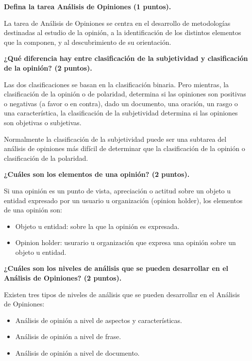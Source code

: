 \documentclass[11pt]{exam}
\begin{document}
\begin{questions}
{\bf \question Defina la tarea Análisis de Opiniones (1 puntos).}

La tarea de Análisis de Opiniones se centra en el desarrollo de metodologías destinadas al estudio de la opinión, a la identificación de los distintos elementos que la componen, y al descubrimiento de su orientación.

\newpage

{\bf \question ¿Qué diferencia hay entre clasificación de la subjetividad y clasificación de la opinión? (2 puntos).}

Las dos clasificaciones se basan en la clasificación binaria. Pero mientras, la clasificación de la opinión o de polaridad, determina si las opiniones son positivas o negativas (a favor o en contra), dado un documento, una oración, un rasgo o una característica, la clasificación de la subjetividad determina si las opiniones son objetivas o subjetivas.

Normalmente la clasificación de la subjetividad puede ser una subtarea del análisis de opiniones más difícil de determinar que la clasificación de la opinión o clasificación de la polaridad.

{\bf \question ¿Cuáles son los elementos de una opinión? (2 puntos).}

Si una opinión es un punto de vista, apreciación o actitud sobre un objeto u entidad expresado por un usuario u organización (opinion holder), los elementos de una opinión son:

\begin{itemize}
	\item Objeto u entidad: sobre la que la opinión es expresada.
	\item Opinion holder: usurario u organización que expresa una opinión sobre un objeto u entidad.
\end{itemize}

{\bf \question ¿Cuáles son los niveles de análisis que se pueden desarrollar en el Análisis de Opiniones? (2 puntos).}

Existen tres tipos de niveles de análisis que se pueden desarrollar en el Análisis de Opiniones:

\begin{itemize}
	\item Análisis de opinión a nivel de aspectos y características.
	\item Análisis de opinión a nivel de frase.
	\item Análisis de opinión a nivel de documento.
\end{itemize}

\end{questions}
	
\end{document}
